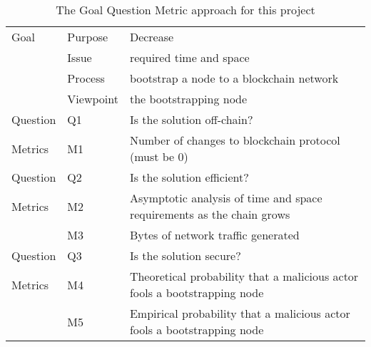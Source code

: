 \begin{center}
\begin{table}[h]
    \begin{tabular}{|ll|l|}
        \hline
        Goal & Purpose    & Decrease \\
             & Issue      & required time and space \\
             & Process    & bootstrap a node to a blockchain network \\
             & Viewpoint  & the bootstrapping node \\ \hline

        Question & Q1 & Is the solution off-chain? \\ \hline
        Metrics  & M1 & Number of changes to blockchain protocol (must be 0) \\ \hline

        Question & Q2 & Is the solution efficient? \\ \hline
        Metrics  & M2 & Asymptotic analysis of time and space requirements as the chain grows \\
                 & M3 & Bytes of network traffic generated \\ \hline

        Question & Q3 & Is the solution secure? \\ \hline
        Metrics  & M4 & Theoretical probability that a malicious actor fools a bootstrapping node \\
                 & M5 & Empirical probability that a malicious actor fools a bootstrapping node \\
        \hline
    \end{tabular}
    \caption{The Goal Question Metric approach for this project}
    \label{tab:gqm}
\end{table}
\end{center}

